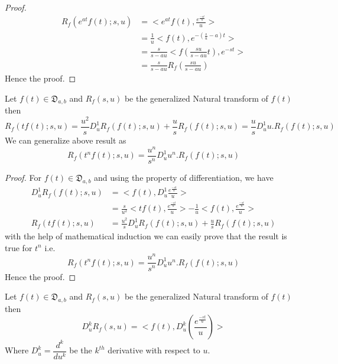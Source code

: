 \begin{proof}
\begin{align*}
 R_{f}(e^{at}f(t);s,u)&=<e^{at}f(t),\frac{e^{\frac{-st}{u}}}{u}>\\
&=\frac{1}{u}<f(t),e^{-(\frac{s}{u}-a)t}>\\
&=\frac{s}{s-au}<f(\frac{su}{s-au}t),e^{-st}>\\
&=\frac{s}{s-au}R_{f}(\frac{su}{s-au})
\end{align*}
Hence the proof.
\end{proof}
\begin{theorem}
 Let $f(t)\in \mathfrak{D}_{a,b}$ and $R_{f}(s,u)$ be the generalized Natural transform of $f(t)$ 
 then 
 \begin{equation*}
 R_{f}(tf(t);s,u)=\frac{u^{2}}{s}D^{1}_{u}R_{f}(f(t);s,u)+\frac{u}{s}R_{f}(f(t);s,u)=\frac{u}{s}D^{1}_{u}u.R_{f}(f(t);s,u)
 \end{equation*}
 We can generalize above result as
  \begin{equation*}  
  R_{f}(t^{n}f(t);s,u)=\frac{u^{n}}{s^{n}}D^{1}_{u}u^{n}.R_{f}(f(t);s,u)
  \end{equation*}
\end{theorem}
\begin{proof}
For $f(t)\in \mathfrak{D}_{a,b}$ and using the property of differentiation, we have
\begin{align*}
 D^{1}_{u}R_{f}(f(t);s,u) &=<f(t),D^{1}_{u}\frac{e^{\frac{-st}{u}}}{u}>\\
 &=\frac{s}{u^{2}}<tf(t),\frac{e^{\frac{-st}{u}}}{u}> - \frac{1}{u}<f(t),\frac{e^{\frac{-st}{u}}}{u}>\\
R_{f}(tf(t);s,u) &=\frac{u^{2}}{s}D^{1}_{u}R_{f}(f(t);s,u)+\frac{u}{s}R_{f}(f(t);s,u)
\end{align*}
with the help of mathematical induction we can easily prove that the result is true for $t^{n}$ i.e.\\
\begin{equation*}  
  R_{f}(t^{n}f(t);s,u)=\frac{u^{n}}{s^{n}}D^{1}_{u}u^{n}.R_{f}(f(t);s,u)
  \end{equation*}
Hence the proof.
\end{proof}
\begin{theorem}
 Let $f(t)\in \mathfrak{D}_{a,b}$ and $R_{f}(s,u)$ be the generalized Natural transform of $f(t)$ then
\begin{equation}
D_{u}^{k}R_{f}(s,u)=<f(t),D_{u}^{k}(\frac{e^{\frac{-st}{u}}}{u})>
\end{equation}
Where $D_{u}^{k}=\dfrac{d^{k}}{du^{k}}$ be the $k^{th}$ derivative with respect to $u$.
\end{theorem}

